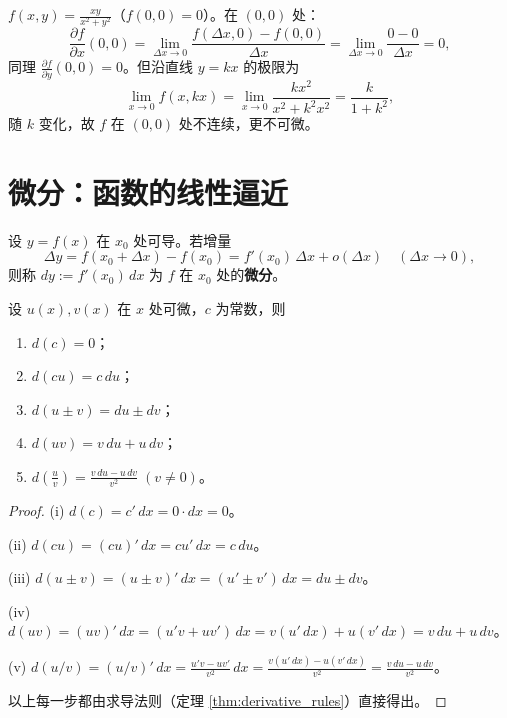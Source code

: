 \begin{remark}[偏导存在不可微的反例]\label{rem:partial_not_differentiable}
$f(x,y) = \frac{xy}{x^2+y^2}$（$f(0,0)=0$）。在 $(0,0)$ 处：
\[
\frac{\partial f}{\partial x}(0,0) = \lim_{\Delta x \to 0} \frac{f(\Delta x, 0) - f(0,0)}{\Delta x} = \lim_{\Delta x \to 0} \frac{0 - 0}{\Delta x} = 0,
\]
同理 $\frac{\partial f}{\partial y}(0,0) = 0$。但沿直线 $y = kx$ 的极限为
\[
\lim_{x \to 0} f(x, kx) = \lim_{x \to 0} \frac{kx^2}{x^2 + k^2x^2} = \frac{k}{1+k^2},
\]
随 $k$ 变化，故 $f$ 在 $(0,0)$ 处不连续，更不可微。
\end{remark}

\section{\texorpdfstring{微分：函数的线性逼近}{微分：函数的线性逼近}}

\begin{definition}[微分作为方向增量的线性主部]\label{def:differential}
设 $y = f(x)$ 在 $x_0$ 处可导。若增量
\[\Delta y = f(x_0 + \Delta x) - f(x_0) = f'(x_0)\,\Delta x + o(\Delta x) \quad (\Delta x \to 0),\]
则称 $dy := f'(x_0)\,dx$ 为 $f$ 在 $x_0$ 处的\textbf{微分}。
\end{definition}

\begin{lemma}[微分运算与导数运算的一致性]\label{lem:differential_rules}
设 $u(x), v(x)$ 在 $x$ 处可微，$c$ 为常数，则
\begin{enumerate}[label=(\roman*)]
    \item $d(c) = 0$；
    \item $d(cu) = c\,du$；
    \item $d(u \pm v) = du \pm dv$；
    \item $d(uv) = v\,du + u\,dv$；
    \item $d\!\left(\frac{u}{v}\right) = \frac{v\,du - u\,dv}{v^2}\;(v \neq 0)$。
\end{enumerate}
\end{lemma}

\begin{proof}
(i) $d(c) = c'\,dx = 0 \cdot dx = 0$。

(ii) $d(cu) = (cu)'\,dx = cu'\,dx = c\,du$。

(iii) $d(u \pm v) = (u \pm v)'\,dx = (u' \pm v')\,dx = du \pm dv$。

(iv) $d(uv) = (uv)'\,dx = (u'v + uv')\,dx = v(u'\,dx) + u(v'\,dx) = v\,du + u\,dv$。

(v) $d(u/v) = (u/v)'\,dx = \frac{u'v - uv'}{v^2}\,dx = \frac{v(u'\,dx) - u(v'\,dx)}{v^2} = \frac{v\,du - u\,dv}{v^2}$。

以上每一步都由求导法则（定理 \ref{thm:derivative_rules}）直接得出。
\end{proof}

